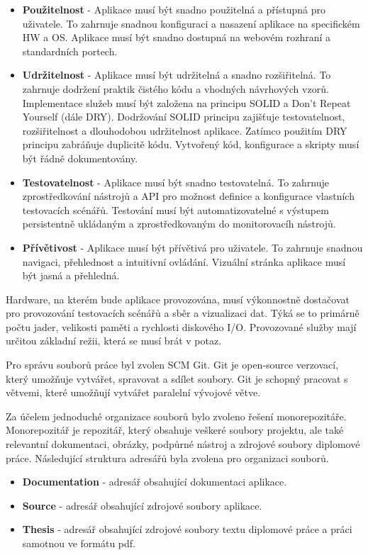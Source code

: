 \begin{itemize}
  \item \textbf{Použitelnost} - Aplikace musí být snadno použitelná a přístupná pro uživatele. To zahrnuje snadnou konfiguraci a nasazení aplikace na specifickém HW a OS. Aplikace musí být snadno dostupná na webovém rozhraní a standardních portech.
  \item \textbf{Udržitelnost} - Aplikace musí být udržitelná a snadno rozšiřitelná. To zahrnuje dodržení praktik čistého kódu a vhodných návrhových vzorů. Implementace služeb musí být založena na principu SOLID a Don't Repeat Yourself (dále DRY). Dodržování SOLID principu zajišťuje testovatelnost, rozšiřitelnost a dlouhodobou udržitelnost aplikace. Zatímco použitím DRY principu zabráňuje duplicitě kódu. Vytvořený kód, konfigurace a skripty musí být řádně dokumentovány.
  \item \textbf{Testovatelnost} - Aplikace musí být snadno testovatelná. To zahrnuje zprostředkování nástrojů a API pro možnost definice a konfigurace vlastních testovacích scénářů. Testování musí být automatizovatelné s výstupem persistentně ukládaným a zprostředkovaným do monitorovacíh nástrojů.
  \item \textbf{Přívětivost} - Aplikace musí být přívětivá pro uživatele. To zahrnuje snadnou navigaci, přehlednost a intuitivní ovládání. Vizuální stránka aplikace musí být jasná a přehledná.
\end{itemize}


Hardware, na kterém bude aplikace provozována, musí výkonnostně dostačovat pro provozování testovacích scénářů a sběr a vizualizaci dat. Týká se to primárně počtu jader, velikosti paměti a rychlosti diskového I/O. Provozované služby mají určitou základní režii, která se musí brát v potaz.


Pro správu souborů práce byl zvolen SCM Git. Git je open-source verzovací, který umožňuje vytvářet, spravovat a sdílet soubory. Git je schopný pracovat s větvemi, které umožňují vytvářet paralelní vývojové větve.

Za účelem jednoduché organizace souborů bylo zvoleno řešení monorepozitáře. Monorepozitář je repozitář, který obsahuje veškeré soubory projektu, ale také relevantní dokumentaci, obrázky, podpůrné nástroj a zdrojové soubory diplomové práce. Následující struktura adresářů byla zvolena pro organizaci souborů.

\begin{itemize}
    \item \textbf{Documentation} - adresář obsahující dokumentaci aplikace.
    \item \textbf{Source} - adresář obsahující zdrojové soubory aplikace.
    \item \textbf{Thesis} - adresář obsahující zdrojové soubory textu diplomové práce a práci samotnou ve formátu pdf.
\end{itemize}

